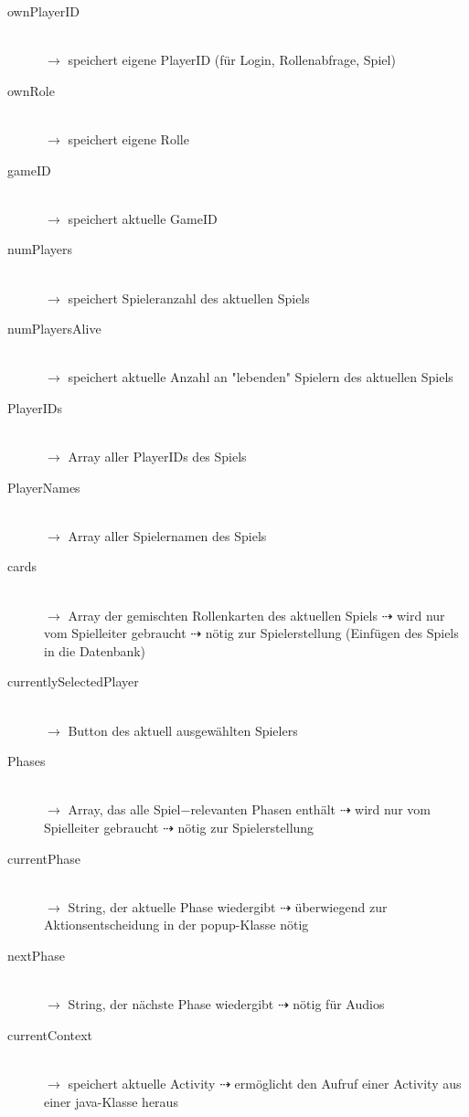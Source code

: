 \documentclass[12pt, a4paper]{article}
\begin{document}
\begin{description}
\item[ownPlayerID]\hfill \\ $\rightarrow$ speichert eigene PlayerID (für Login, Rollenabfrage, Spiel)
\item[ownRole]\hfill \\ $\rightarrow$ speichert eigene Rolle
\item[gameID]\hfill \\ $\rightarrow$ speichert aktuelle GameID
\item[numPlayers]\hfill \\ $\rightarrow$ speichert Spieleranzahl des aktuellen Spiels
\item[numPlayersAlive]\hfill \\ $\rightarrow$ speichert aktuelle Anzahl an "lebenden" Spielern des aktuellen Spiels
\item[PlayerIDs]\hfill \\ $\rightarrow$ Array aller PlayerIDs des Spiels
\item[PlayerNames]\hfill \\ $\rightarrow$ Array aller Spielernamen des Spiels
\item[cards]\hfill \\ $\rightarrow$ Array der gemischten Rollenkarten des aktuellen Spiels $\dashrightarrow$ wird nur vom Spielleiter gebraucht $\dashrightarrow$ nötig zur Spielerstellung (Einfügen des Spiels in die Datenbank)
\item[currentlySelectedPlayer]\hfill \\ $\rightarrow$ Button des aktuell ausgewählten Spielers
\item[Phases]\hfill \\ $\rightarrow$ Array, das alle Spiel$-$relevanten Phasen enthält $\dashrightarrow$ wird nur vom Spielleiter gebraucht $\dashrightarrow$ nötig zur Spielerstellung
\item[currentPhase]\hfill \\ $\rightarrow$ String, der aktuelle Phase wiedergibt $\dashrightarrow$ überwiegend zur Aktionsentscheidung in der popup-Klasse nötig
\item[nextPhase]\hfill \\ $\rightarrow$ String, der nächste Phase wiedergibt $\dashrightarrow$ nötig für Audios
\item[currentContext]\hfill \\ $\rightarrow$ speichert aktuelle Activity $\dashrightarrow$ ermöglicht den Aufruf einer Activity aus einer java-Klasse heraus

\end{description}
\end{document}
